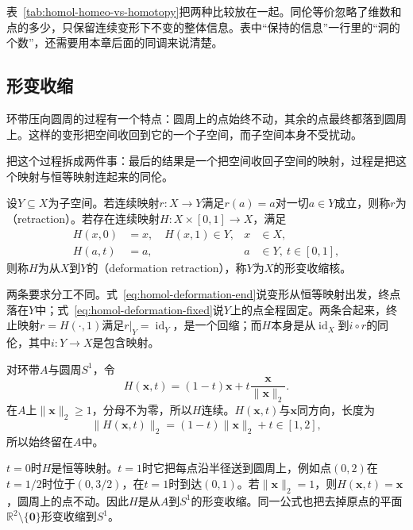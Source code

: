表~\ref{tab:homol-homeo-vs-homotopy}把两种比较放在一起。同伦等价忽略了维数和点的多少，只保留连续变形下不变的整体信息。表中“保持的信息”一行里的“洞的个数”，还需要用本章后面的同调来说清楚。

\subsection{形变收缩}
\label{sec:homol-deformation-retraction}

环带压向圆周的过程有一个特点：圆周上的点始终不动，其余的点最终都落到圆周上。这样的变形把空间收回到它的一个子空间，而子空间本身不受扰动。

把这个过程拆成两件事：最后的结果是一个把空间收回子空间的映射，过程是把这个映射与恒等映射连起来的同伦。

\begin{definition}[形变收缩]
\label{def:homol-deformation-retraction}
设$Y\subseteq X$为子空间。若连续映射$r:X\to Y$满足$r(a)=a$对一切$a\in Y$成立，则称$r$为（retraction）。若存在连续映射$H:X\times[0,1]\to X$，满足
\begin{align}
 H(x,0)&=x,\quad H(x,1)\in Y,&x&\in X,\label{eq:homol-deformation-end}\\
 H(a,t)&=a,&a&\in Y,\ t\in[0,1],\label{eq:homol-deformation-fixed}
\end{align}
则称$H$为从$X$到$Y$的（deformation retraction），称$Y$为$X$的形变收缩核。
\end{definition}

两条要求分工不同。式~\eqref{eq:homol-deformation-end}说变形从恒等映射出发，终点落在$Y$中；式~\eqref{eq:homol-deformation-fixed}说$Y$上的点全程固定。两条合起来，终止映射$r=H(\cdot,1)$满足$r|_Y=\operatorname{id}_Y$，是一个回缩；而$H$本身是从$\operatorname{id}_X$到$i\circ r$的同伦，其中$i:Y\to X$是包含映射。

\begin{example}[环带收向圆周]
\label{ex:homol-annulus-retraction}
对环带$A$与圆周$S^1$，令
\begin{equation}
 H(\bm x,t)=(1-t)\bm x+t\frac{\bm x}{\lVert\bm x\rVert_2}.
 \label{eq:homol-annulus-retraction}
\end{equation}
在$A$上$\lVert\bm x\rVert_2\geq1$，分母不为零，所以$H$连续。$H(\bm x,t)$与$\bm x$同方向，长度为
\[
 \lVert H(\bm x,t)\rVert_2=(1-t)\lVert\bm x\rVert_2+t\in[1,2],
\]
所以始终留在$A$中。

$t=0$时$H$是恒等映射。$t=1$时它把每点沿半径送到圆周上，例如点$(0,2)$在$t=1/2$时位于$(0,3/2)$，在$t=1$时到达$(0,1)$。若$\lVert\bm x\rVert_2=1$，则$H(\bm x,t)=\bm x$，圆周上的点不动。因此$H$是从$A$到$S^1$的形变收缩。同一公式也把去掉原点的平面$\mathbb R^2\setminus\{\bm 0\}$形变收缩到$S^1$。
\end{example}

